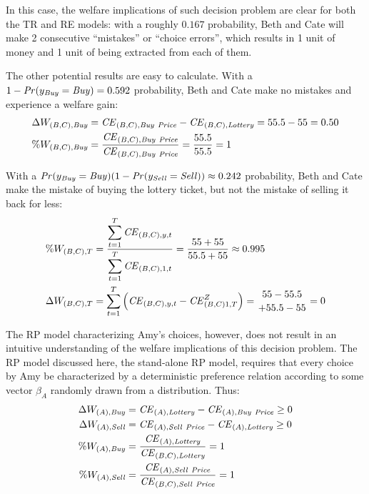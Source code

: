 In this case, the welfare implications of such decision problem are clear for both the TR and RE  models: with a roughly $0.167$ probability, Beth and Cate will make 2 consecutive \enquote{mistakes} or \enquote{choice errors}, which results in 1 unit of money and 1 unit of {\CE} being extracted from each of them.

The other potential results are easy to calculate.
With a ${1- {\mathit{Pr}}(y_{\mathit{Buy}}} = \mathit{Buy}) = 0.592$ probability, Beth and Cate make no mistakes and experience a welfare gain:
\begin{align}
	\begin{split}
		\Delta W_{(B,C),\mathit{Buy}} &= {\mathit{CE}}_{(B,C),\mathit{Buy\ Price}} - {\mathit{CE}}_{(B,C),\mathit{Lottery}} = 55.5 - 55 = 0.50\\
		\% W_{(B,C),\mathit{Buy}} &= \frac{{\mathit{CE}}_{(B,C),\mathit{Buy\ Price}}}{{\mathit{CE}}_{(B,C),\mathit{Buy\ Price}}} = \frac{55.5}{55.5} = 1
	\end{split}
\end{align}

With a $ {\mathit{Pr}}(y_{\mathit{Buy}} = \mathit{Buy})(1 - {\mathit{Pr}}(y_{\mathit{Sell}}= \mathit{Sell})) \approx 0.242$ probability, Beth and Cate make the mistake of buying the lottery ticket, but not the mistake of selling it back for less:
\begin{align}
	\begin{split}
		\%W_{(B,C),T} &= \frac{\displaystyle\sum_{t=1}^{T} {\CE}_{(B,C),y,t} }{\displaystyle\sum_{t=1}^{T} {\CE}_{(B,C),1,t}} = \frac{55 + 55}{55.5 + 55} \approx 0.995 \\
		\Delta W_{(B,C),T} &= \sum_{t=1}^T \left( {\CE}_{(B,C),y,t} - {\CE}_{(B,C)1,T}^Z \right)= \genfrac{}{}{0pt}{}{55 - 55.5}{+ 55.5 - 55} = 0
	\end{split}
\end{align}

The RP model characterizing Amy's choices, however, does not result in an intuitive understanding of the welfare implications of this decision problem.
The RP model discussed here, the stand-alone RP model, requires that every choice by Amy be characterized by a deterministic preference relation according to some vector $\beta_A$ randomly drawn from a distribution.
Thus:
\begin{align}
	\label{eq:RP.welfare}
	\begin{split}
		\Delta W_{(A),\mathit{Buy}} &= {\mathit{CE}}_{(A),\mathit{Lottery}} - {\mathit{CE}}_{(A),\mathit{Buy\ Price}} \geq 0\\
		\Delta W_{(A),\mathit{Sell}} &= {\mathit{CE}}_{(A),\mathit{Sell\ Price}} - {\mathit{CE}}_{(A),\mathit{Lottery}} \geq 0\\
		\% W_{(A),\mathit{Buy}} &= \frac{{\mathit{CE}}_{(A),\mathit{Lottery}}}{{\mathit{CE}}_{(B,C),\mathit{Lottery}}} = 1\\
		\% W_{(A),\mathit{Sell}} &= \frac{{\mathit{CE}}_{(A),\mathit{Sell\ Price}}}{{\mathit{CE}}_{(B,C),\mathit{Sell\ Price}}} = 1
	\end{split}
\end{align}

